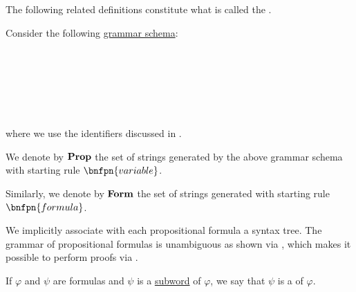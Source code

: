 \begin{definition}\label{def:propositional_syntax}\mimprovised
  The following related definitions constitute what is called the .

  \begin{thmenum}
     Consider the following \hyperref[rem:backus_normal_form]{grammar schema}:
    \begin{bnf*}
                 {} \\
               {\bnftsq{\( \vee \)} \bnfor \bnftsq{\( \wedge \)} \bnfor \bnftsq{\( \rightarrow \)} \bnfor \bnftsq{\( \leftrightarrow \)}} \\
                  {\bnftsq{\( \top \)} \bnfor \bnftsq{\( \bot \)} \bnfor} \\
       \\
       \\
    \end{bnf*}
    where we use the identifiers discussed in .

     We denote by \( \operatorname{\mathbf{Prop}} \) the set of strings generated by the above grammar schema with starting rule \( \bnfpn{variable} \).

     Similarly, we denote by \( \operatorname{\mathbf{Form}} \) the set of strings generated with starting rule \( \bnfpn{formula} \).

    We implicitly associate with each propositional formula a syntax tree. The grammar of propositional formulas is unambiguous as shown via , which makes it possible to perform proofs via .

     If \( \varphi \) and \( \psi \) are formulas and \( \psi \) is a \hyperref[def:formal_language/subword]{subword} of \( \varphi \), we say that \( \psi \) is a  of \( \varphi \).


\end{thmenum}
\end{definition}
